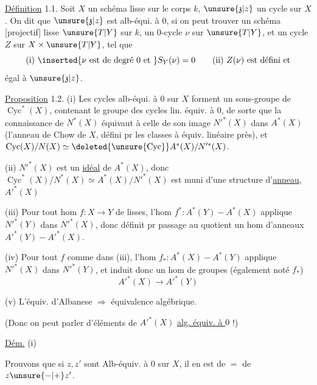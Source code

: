 \uline{Définition} 1.1. Soit $X$ un schéma \deleted{[projectif]} lisse sur le corps $k$, $\unsure{\mathfrak z|z}$ un cycle sur $X$. On dit que $\unsure{\mathfrak z|z}$ est alb-équi. à $0$, si on peut trouver un schéma [projectif] lisse   $\unsure{T|Y}$ sur $k$,  un $0$-cycle  $\nu$ sur $\unsure{T|Y}$, et un cycle $Z$ sur $X\times\unsure{T|Y}$, tel que
\[
\text{(i) }\inserted{\nu\text{ est de degré }0\text{ et }}S_Y(\nu)=0\qquad\text{(ii) }Z(\nu)\text{ est défini et}
\]
égal à $\unsure{\mathfrak z|z}$.


\uline{Proposition} 1.2. (i) Les cycles alb-équi. à $0$ sur $X$ forment un sous-groupe  de $\operatorname{Cyc}^*(X)$, contenant le groupe des cycles lin. équiv. à $0$, de sorte que la connaissance de $N^*(X)$ équivaut à celle de son image $N'^*(X)$ dans  $A^*(X)$ (l'anneau de Chow de $X$, défini pr les classes à équiv. linéaire près), et $\operatorname{Cyc}(X)/N(X)\simeq\deleted{\unsure{\operatorname{Cyc}}}A^*(X)/N'^*(X)$.



(ii) $N'^*(X)$ est un \uline{idéal} de $A^*(X)$, donc $\operatorname{Cyc}^*(X)/N^*(X)\simeq A^*(X)/N'^*(X)$ est muni d'une structure d'\uline{anneau},  $A'^*(X)$

(iii) Pour tout hom $f:X\longrightarrow Y$ de    lisses, l'hom $f^*:A^*(Y)\mathbin{-}A^*(X)$ applique $N'^*(Y)$ dans $N'^*(X)$, donc définit pr passage au quotient un hom d'anneaux $A'^*(Y)\mathbin{-}A'^*(X)$.

(iv) Pour tout $f$ comme dans (iii),  l'hom  $f_*:A^*(X)\mathbin{-}A^*(Y)$  applique $N'^*(X)$ dans $N'^*(Y)$, et induit donc un hom de groupes (également noté $f_*$)
\[
A'^*(X)\longrightarrow A'^*(Y)
\]

(v) L'équiv. d'Albanese $\Longrightarrow$ équivalence algébrique.

(Donc on peut parler d'éléments de $A'^*(X)$ \uline{alg. équiv. à $0$} !)

\uline{Dém.} (i)  

Prouvons que si $z,z'$ sont Alb-équiv. à $0$ sur $X$, il en est de $=$ de $z\unsure{-|+}z'$.

